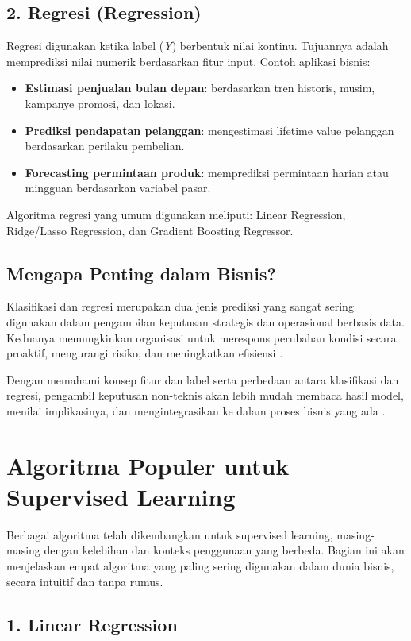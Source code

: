 \subsection*{2. Regresi (Regression)}
Regresi digunakan ketika label (\textit{Y}) berbentuk nilai kontinu. Tujuannya adalah memprediksi nilai numerik berdasarkan fitur input.  
Contoh aplikasi bisnis:
\begin{itemize}
	\item \textbf{Estimasi penjualan bulan depan}: berdasarkan tren historis, musim, kampanye promosi, dan lokasi.
	\item \textbf{Prediksi pendapatan pelanggan}: mengestimasi lifetime value pelanggan berdasarkan perilaku pembelian.
	\item \textbf{Forecasting permintaan produk}: memprediksi permintaan harian atau mingguan berdasarkan variabel pasar.
\end{itemize}
Algoritma regresi yang umum digunakan meliputi: Linear Regression, Ridge/Lasso Regression, dan Gradient Boosting Regressor.

\subsection*{Mengapa Penting dalam Bisnis?}
Klasifikasi dan regresi merupakan dua jenis prediksi yang sangat sering digunakan dalam pengambilan keputusan strategis dan operasional berbasis data. Keduanya memungkinkan organisasi untuk merespons perubahan kondisi secara proaktif, mengurangi risiko, dan meningkatkan efisiensi \cite{chen2012}.

Dengan memahami konsep fitur dan label serta perbedaan antara klasifikasi dan regresi, pengambil keputusan non-teknis akan lebih mudah membaca hasil model, menilai implikasinya, dan mengintegrasikan ke dalam proses bisnis yang ada \cite{provost2013data}.


\section{Algoritma Populer untuk Supervised Learning}

Berbagai algoritma telah dikembangkan untuk supervised learning, masing-masing dengan kelebihan dan konteks penggunaan yang berbeda. Bagian ini akan menjelaskan empat algoritma yang paling sering digunakan dalam dunia bisnis, secara intuitif dan tanpa rumus.

\subsection*{1. Linear Regression}

